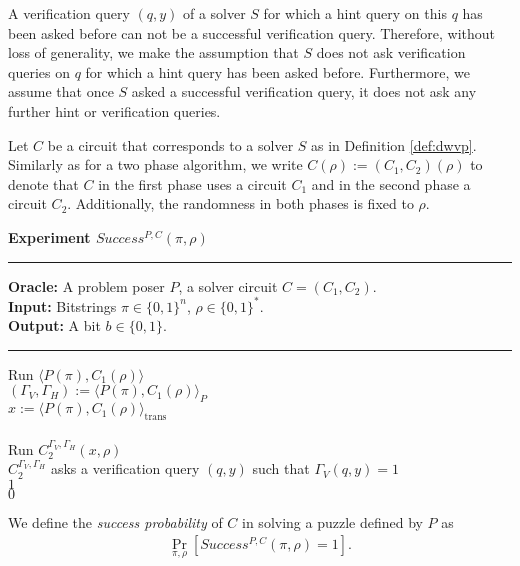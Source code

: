 A verification query $(q,y)$ of a solver $S$ for which a hint query on this $q$ has been asked before can not be a successful verification query.
Therefore, without loss of generality, we make the assumption that $S$ does not ask verification queries on $q$
for which a hint query has been asked before. Furthermore, we assume that once $S$ asked a successful verification query,
it does not ask any further hint or verification queries.

Let $C$ be a circuit that corresponds to a solver $S$ as in Definition \ref{def:dwvp}.
Similarly as for a two phase algorithm, we write $C(\rho) := (C_1, C_2)(\rho)$ to denote that $C$
in the first phase uses a circuit $C_1$ and in the second phase a circuit $C_2$.
Additionally, the randomness in both phases is fixed to $\rho$.

%
\begin{codeblock}
  \textbf{Experiment $Success^{P, C}(\pi, \rho) $}
  \medskip
  \hrule
  \medskip
  \textbf{Oracle:} A problem poser $P$, a solver circuit $C = (C_1, C_2)$.\\
  \textbf{Input:}  Bitstrings $\pi \in \{0,1\}^n$, $\rho \in \{0,1\}^*$.\\
  \textbf{Output:} A bit $b \in \{0,1\}$.
  \medskip\hrule\medskip
  Run $\langle P(\pi), C_1(\rho) \rangle$ \\
  \IndI $(\Gamma_V, \Gamma_H) := \langle P(\pi), C_1(\rho) \rangle_{P}$ \\
  \IndI $x := \langle P(\pi), C_1(\rho) \rangle_{\text{trans}}$ \\ \\
  Run $C_2^{\Gamma_V,\Gamma_H}(x, \rho)$ \\
  \IndI \If $C_2^{\Gamma_V, \Gamma_H}$ asks a verification query $(q, y)$ such that $\Gamma_V(q, y) = 1$ \then \\
  \IndII \return $1$ \\
  \return $0$ \\
\end{codeblock}
%
We define the \textit{success probability} of $C$ in solving a puzzle defined by $P$ as
\begin{align}
 \underset{\pi, \rho}{\Pr}[Success^{P,C}(\pi, \rho) = 1].
\end{align}
%
